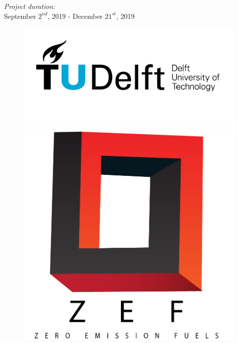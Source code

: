 \documentclass[12pt]{extarticle}
\begin{document}
\begin{titlepage}
\emph{Project duration:}\\
September $2^{nd}$, 2019 - December $21^{st}$, 2019
\\[4cm]
\begin{figure}[H]
\centering
\begin{minipage}{.5\textwidth}
  \centering
  \includegraphics[width=\linewidth]{images/TU_delft_logo.jpg}
\end{minipage}%
\begin{minipage}{.5\textwidth}
  \centering
  \includegraphics[scale=0.15]{images/zef.png}
\end{minipage}
\end{figure}
\end{titlepage}
\end{document}
